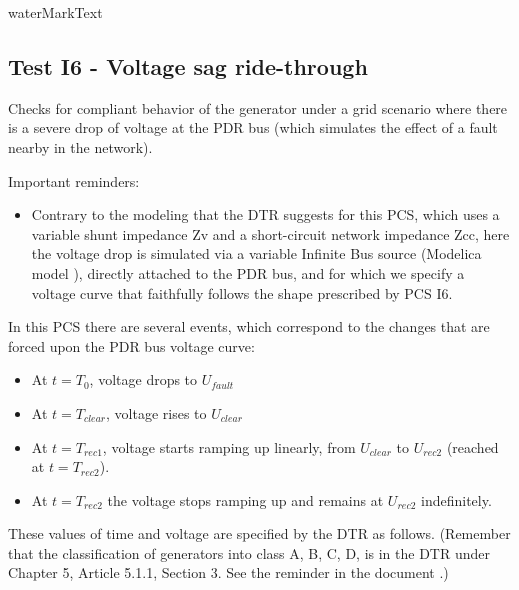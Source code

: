     {{ waterMarkText }}

    \renewcommand{\DTRPcs}{GridVoltageDip} %
    \renewcommand{\PCSname}{PCS_RTE-I16z3}
    \renewcommand{\OCname}{Qzero}


    \subsection{Test I6 - Voltage sag ride-through}

    Checks for compliant behavior of the generator under a grid scenario where there is a
    severe drop of voltage at the PDR bus (which simulates the effect of a fault
    nearby in the network).

    \GridCircuitZthree

    \noindent Important reminders:
    \begin{itemize}
        \item Contrary to the modeling that the DTR suggests for this PCS, which uses a
        variable shunt impedance Zv and a short-circuit network impedance Zcc, here
        the voltage drop is simulated via a variable Infinite Bus source (Modelica
        model ), directly attached to the PDR bus, and for
        which we specify a voltage curve that faithfully follows the shape prescribed
        by PCS I6.
    \end{itemize}

    In this PCS there are several events, which correspond to the changes that are
    forced upon the PDR bus voltage curve:
    \begin{itemize}
        \item At $t = T_{0}$, voltage drops to $U_{fault}$
        \item At $t = T_{clear}$, voltage rises to $U_{clear}$
        \item At $t = T_{rec1}$, voltage starts ramping up linearly, from $U_{clear}$ to
        $U_{rec2}$ (reached at $t = T_{rec2}$).
        \item At $t = T_{rec2}$ the voltage stops ramping up and remains at $U_{rec2}$
        indefinitely.
    \end{itemize}
    These values of time and voltage are specified by the DTR as follows. (Remember
    that the classification of generators into class A, B, C, D, is in the DTR under
    Chapter 5, Article 5.1.1, Section 3. See the reminder in the document
    .)


